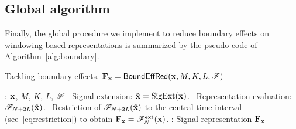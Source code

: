 \subsection{Global algorithm}
Finally, the global procedure we implement to reduce boundary effects on windowing-based representations is summarized by the pseudo-code of Algorithm~\ref{alg:boundary}.

\begin{algorithm}
\caption{Tackling boundary effects. ${\mathbf F}_{\mathbf x} = \mathsf{BoundEffRed(}{\mathbf x},M,K,L,{\mathscr F})$}
\label{alg:boundary}
\begin{algorithmic}
: ${\mathbf x}$, $M$, $K$, $L$, ${\mathscr F}$
\STATE 
{}
\STATE \quad\textbullet\ Signal extension: $\tilde{{\mathbf x}} = \mathrm{SigExt}({\mathbf x})$.
\STATE 
{}
\STATE \quad\textbullet\ Representation evaluation: ${\mathscr F}_{N+2L}(\tilde{{\mathbf x}})$.
\STATE \quad\textbullet\ Restriction of ${\mathscr F}_{N+2L}(\tilde{{\mathbf x}})$ to the central time interval (see~\eqref{eq:restriction}) to obtain ${\mathbf F}_{\mathbf x}={\mathscr F}_N^{\mathrm{ext}}({\mathbf x})$.
\STATE 
{}: Signal representation ${\mathbf F}_{\mathbf x}$
\end{algorithmic}
\end{algorithm}